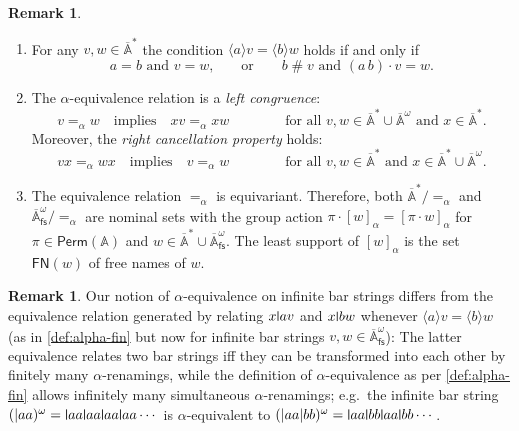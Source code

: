 \documentclass[10pt,a4paper]{amsart}
\newcommand{\midmid}{\hspace{0.2ex}{\rule[-0.1ex]{0.6pt}{1.65ex}}\hspace{0.2ex}}
\newcommand{\newletter}[1]{{\midmid}#1}
\renewcommand{\o}{\cdot}
\newcommand{\free}[1]{\mathsf{FN}(#1)}
\newcommand{\barA}{\overline{\names}}
\numberwithin{equation}{section}
\newcommand{\Perm}{\mathsf{Perm}}
\newcommand{\braket}[1]{\langle #1 \rangle}
\newcommand{\fs}{\mathsf{fs}}
\newcommand{\+}[1]{\mathcal{#1}\xspace}
\newcommand{\names}{\mathbb{A}}
\DeclareMathOperator{\supp}{\mathsf{supp}} %
\newcommand{\fresh}{\mathbin{\#}}
\theoremstyle{definition}
\newtheorem{rem}[theorem]{Remark}
\begin{document}
\begin{rem}\label{rem:alpheq-technical}
  \begin{enumerate}
  \item For any $v,w\in \barA^*$ the condition $\braket{a} v = \braket{b} w$ holds if
    and only if
    \[
      \text{$a=b$ and $v=w$,}
      \qquad \text{or}\qquad
      \text{$b\fresh v$ and $(a\, b)\o v = w$.}
    \]
  \item The $\alpha$-equivalence relation is a \emph{left congruence}: 
    \[
      v=_\alpha w\quad\text{implies}\quad xv=_\alpha xw
      \qquad\qquad
      \text{for all $v,w\in \barA^*\cup \barA^\omega$ and $x\in \barA^*$.}
    \]
    Moreover, the \emph{right cancellation property} holds:
    \[
      vx=_\alpha wx \quad\text{implies}\quad v=_\alpha w
      \qquad\qquad
      \text{for all $v,w\in \barA^*$ and $x\in \barA^*\cup \barA^\omega$.}
    \]
  \item The equivalence relation $=_\alpha$ is equivariant. Therefore, both $\barA^*/{=_\alpha}$ and $\barA^\omega_\fs/{=_\alpha}$ are nominal sets with the group action $\pi\o [w]_\alpha = [\pi\o w]_\alpha$ for $\pi\in \Perm(\names)$ and $w\in \barA^*\cup \barA^\omega_\fs$.
  The least support of $[w]_\alpha$ is
    the set $\free{w}$ of free names of $w$.
  \end{enumerate}
\end{rem}

\begin{rem}
  Our notion of $\alpha$-equivalence on infinite bar strings differs
  from the equivalence relation generated by relating $x\newletter av$
  and $x\newletter bw$ whenever $\braket{a} v = \braket{b} w$ (as in
  \autoref{def:alpha-fin} but now for infinite bar strings
  $v,w\in \barA^\omega_\fs$): The latter equivalence relates two bar
  strings iff they can be transformed into each other by finitely many
  $\alpha$-renamings, while the definition of $\alpha$-equivalence as
  per \autoref{def:alpha-fin} allows infinitely many simultaneous
  $\alpha$-renamings; e.g.~the infinite bar string
  $(|aa)^\omega= \newletter aa \newletter aa\newletter aa\newletter aa
  \cdots$ is $\alpha$-equivalent to
  $(|aa|bb)^\omega = \newletter aa \newletter bb\newletter aa
  \newletter bb\cdots$.
\end{rem}
%
%
\end{document}
